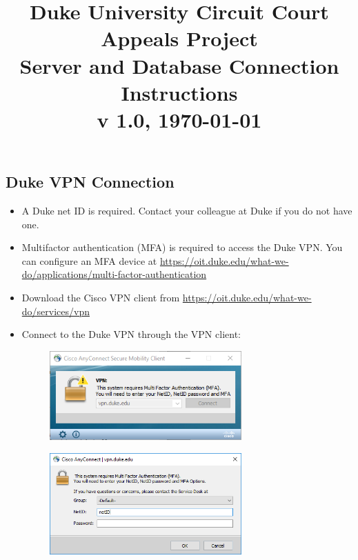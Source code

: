 \documentclass[10pt, letterpaper]{article}
\title{\large \vspace{-0.5in} Duke University Circuit Court Appeals Project\\[10pt]
       Server and Database Connection Instructions\\[10pt] v 1.0, \today\\[-20pt]}
\date{}
\begin{document}
\begin{spacing}{1.0}
    
\maketitle

\section{Duke VPN Connection}

\begin{itemize}
    \item A Duke net ID is required.  Contact your colleague at Duke if you do not have one.
    \item Multifactor authentication (MFA) is required to access the Duke VPN.  You can configure an MFA device at \url{https://oit.duke.edu/what-we-do/applications/multi-factor-authentication}
    \item Download the Cisco VPN client from \url{https://oit.duke.edu/what-we-do/services/vpn}
    \item Connect to the Duke VPN through the VPN client:\\
    \begin{figure}[H]
        \includegraphics[width=2.9in]{VPN01.png}
        \centering
        \caption*{}
        \label{}
    \end{figure}
    \vspace{-0.45in}
    \begin{figure}[H]
        \includegraphics[width=2.9in]{VPN02.png}
        \centering
        \caption*{}
        \label{}
    \end{figure}
    \vspace{-0.45in}

\end{itemize}
\end{spacing}
\end{document}
